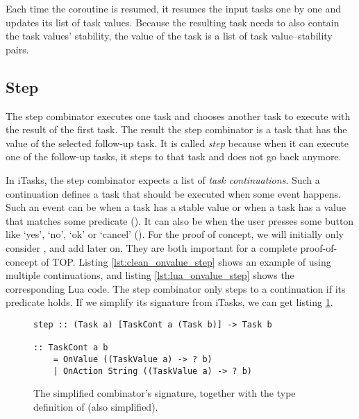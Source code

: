 Each time the  coroutine is resumed, it resumes the input tasks one by one and updates its list of task values. Because the resulting task needs to also contain the task values' stability, the value of the  task is a list of task value--stability pairs.

\subsection{Step}
The step combinator executes one task and chooses another task to execute with the result of the first task. The result the step combinator is a task that has the value of the selected follow-up task. It is called \textit{step} because when it can execute one of the follow-up tasks, it steps to that task and does not go back anymore.

In iTasks, the step combinator expects a list of \textit{task continuations}. Such a continuation defines a task that should be executed when some event happens. Such an event can be when a task has a stable value or when a task has a value that matches some predicate (). It can also be when the user presses some button like `yes', `no', `ok' or `cancel' (). For the proof of concept, we will initially only consider , and add  later on. They are both important for a complete proof-of-concept of TOP. Listing \ref{lst:clean_onvalue_step} shows an example of using multiple  continuations, and listing \ref{lst:lua_onvalue_step} shows the corresponding Lua code. The step combinator only steps to a continuation if its predicate holds. If we simplify its signature from iTasks, we can get listing \ref{lst:clean_step}.

\begin{figure}[ht]
\centering
\begin{verbatim}
step :: (Task a) [TaskCont a (Task b)] -> Task b

:: TaskCont a b
    = OnValue ((TaskValue a) -> ? b)
    | OnAction String ((TaskValue a) -> ? b)
\end{verbatim}
\caption{The simplified  combinator's signature, together with the type definition of  (also simplified).}
\label{lst:clean_step}
\end{figure}

